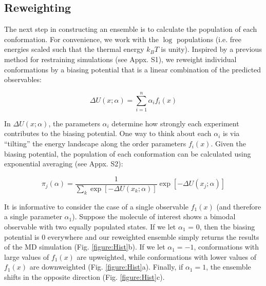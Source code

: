 \documentclass[11pt,titlepage]{article}
\begin{document}
\subsection*{Reweighting}

The next step in constructing an ensemble is to calculate the population of each conformation.  For convenience, we work with the $\log$ populations (i.e. free energies scaled such that the thermal energy $k_B T$ is unity). Inspired by a previous method for restraining simulations  \citep{chodera2012} (see Appx. S1), we reweight individual conformations by a biasing potential that is a linear combination of the predicted observables:

$$\Delta U(x;\alpha) = \sum_{i=1}^n \alpha_i f_i(x)$$

In $\Delta U(x;\alpha)$, the parameters $\alpha_i$ determine how strongly each experiment contributes to the biasing potential.  One way to think about each $\alpha_i$ is via ``tilting'' the energy landscape along the order parameters $f_i(x)$.  Given the biasing potential, the population of each conformation can be calculated using exponential averaging (see Appx. S2):

$$\pi_j(\alpha) = \frac{1}{\sum_k \exp[-\Delta U(x_k;\alpha)]} \exp[-\Delta U(x_j;\alpha)]$$

It is informative to consider the case of a single observable $f_1(x)$ (and therefore a single parameter $\alpha_1$).  Suppose the molecule of interest shows a bimodal observable with two equally populated states.  If we let $\alpha_1$ = 0, then the biasing potential is $0$ everywhere and our reweighted ensemble simply returns the results of the MD simulation (Fig. \ref{figure:Hist}b).  If we let $\alpha_1 = -1$, conformations with large values of $f_1(x)$ are upweighted, while conformations with lower values of $f_1(x)$ are downweighted (Fig. \ref{figure:Hist}a).  Finally, if $\alpha_1 = 1$, the ensemble shifts in the opposite direction (Fig. \ref{figure:Hist}c).  
\end{document}
